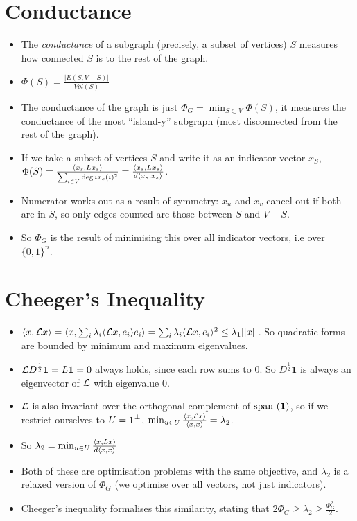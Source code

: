 \documentclass[11pt]{article}
\begin{document}
\section{Conductance}
\label{sec:org90b22e4}
\begin{itemize}
\item The \emph{conductance} of a subgraph (precisely, a subset of vertices) \(S\) measures how connected \(S\) is to the rest of the graph.
\item \(\Phi(S)=\frac{|E(S,V-S)|}{Vol(S)}\)
\item The conductance of the graph  is just \(\Phi_G=\min_{S \subset V} \Phi(S)\), it measures the conductance of the most ``island-y'' subgraph (most disconnected from the rest of the graph).
\item If we take a subset of vertices \(S\) and write it as an indicator vector \(x_S\), \(\Phi(S)=\frac{\langle x_s , Lx_s \rangle}{\sum_{i \in V}\deg i x_s(i)^2}= \frac{\langle x_s , Lx_s \rangle}{d \langle x_s , x_s \rangle}\).
\end{itemize}

\begin{itemize}
\item Numerator works out as a result of symmetry: \(x_u\) and \(x_v\) cancel out if both are in \(S\), so only edges counted are those between \(S\) and \(V-S\).
\item So \(\Phi_G\) is the result of minimising this over all indicator vectors, i.e over \(\{0,1\}^n\).
\end{itemize}
\section{Cheeger's Inequality}
\label{sec:orgdba636c}
\begin{itemize}
\item \(\langle x , \mathcal{L} x \rangle=\langle x , \sum_i \lambda_i\langle \mathcal{L} x , e_i \rangle e_i \rangle=\sum_i \lambda_i\langle \mathcal{L} x , e_i \rangle^2 \le \lambda_1 ||x||\). So quadratic forms are bounded by minimum and maximum eigenvalues.
\item \(\mathcal{L} D^{\frac12}\textbf{1}=L \textbf{1}=0\) always holds, since each row sums to \(0\). So \(D^{\frac12}\textbf{1}\) is always an eigenvector of \(\mathcal{L}\) with eigenvalue \(0\).
\item \(\mathcal{L}\) is also invariant over the orthogonal complement of \(\text{span }(\textbf{1})\), so if we restrict ourselves to \(U=\textbf{1}^{\perp}\), \(\min_{u \in U}\frac{\langle x , \mathcal{L} x \rangle}{\langle x , x \rangle}=\lambda_2\).
\item So \(\lambda_2=\min_{u \in U}\frac{\langle x , Lx \rangle}{d\langle x , x \rangle}\)
\item Both of these are optimisation problems with the same objective, and \(\lambda_2\) is a relaxed version of \(\Phi_G\) (we optimise over all vectors, not just indicators).
\item Cheeger's inequality formalises this similarity, stating that \(2 \Phi_G \ge \lambda_2 \ge \frac{\Phi_{G}^{2}}{2}\).
\end{itemize}
\end{document}
